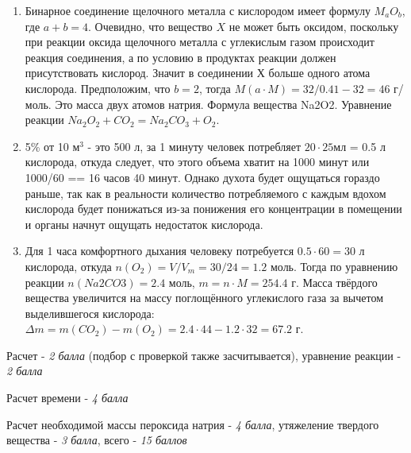\solutionSection

\begin{enumerate}
    \item Бинарное соединение щелочного металла с кислородом имеет формулу $M_aO_b$, где $a+b=4$. Очевидно, что 
    вещество $X$ не может быть оксидом, поскольку при реакции оксида щелочного металла с углекислым газом 
    происходит реакция соединения, а по условию в продуктах реакции должен присутствовать кислород. Значит в 
    соединении Х больше одного атома кислорода. Предположим, что $b=2$, тогда $M(a \cdot M) = 32/0.41 - 32 = 46$ 
    г/моль. Это масса двух атомов натрия. Формула вещества Na2O2. Уравнение реакции $Na_2O_2 + CO_2 = Na_2CO_3 + O_2$.
    \item 5\% от 10 м$^3$ - это 500 л, за 1 минуту человек потребляет $20\cdot 25$мл = 0.5 л кислорода, откуда 
    следует, что этого объема хватит на 1000 минут или 1000/60 =\linebreak = 16 часов 40 минут. Однако духота будет ощущаться 
    гораздо раньше, так как в реальности количество потребляемого с каждым вдохом кислорода будет понижаться из-за 
    понижения его концентрации в помещении и органы начнут ощущать недостаток кислорода.
    \item Для 1 часа комфортного дыхания человеку потребуется $0.5 \cdot 60 = 30$ л кислорода, откуда $n(O_2) = V/V_m = 30/24 = 1.2$ моль. Тогда 
    по уравнению реакции $n(Na2CO3) = 2.4$ моль, $m =n \cdot M = 254.4$ г. Масса твёрдого вещества увеличится на 
    массу поглощённого углекислого газа за вычетом выделившегося кислорода: $\Delta m = m(CO_2) - m(O_2) = 2.4 \cdot 44 - 1.2 \cdot 32 = 67.2$ г.
\end{enumerate}

Расчет - \textit{2 балла} (подбор с проверкой также засчитывается), уравнение реакции - \textit{2 балла}

Расчет времени - \textit{4 балла}

Расчет необходимой массы пероксида натрия - \textit{4 балла}, утяжеление твердого вещества - \textit{3 балла}, всего - \textit{15 баллов}